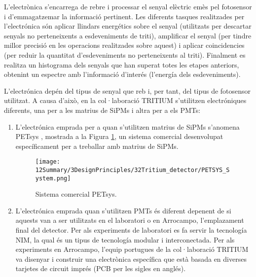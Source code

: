 L'electrònica s'encarrega de rebre i processar el senyal elèctric emès pel fotosensor i d'emmagatzemar la informació pertinent. Les diferents tasques realitzades per l'electrónica són aplicar llindars energétics sobre el senyal (utilitzats per descartar senyals no perteneixents a esdeveniments de triti), amplificar el senyal (per tindre millor precisió en les operacions realitzades sobre aquest) i aplicar coincidencies (per reduir la quantitat d'esdeveniments no perteneixents al triti). Finalment es realitza un histograma dels senyals que han superat totes les etapes anteriors, obtenint un espectre amb l'informació d'interés (l'energía dels esdeveniments). 

L'electrónica depén del tipus de senyal que reb i, per tant, del tipus de fotosensor utilitzat. A causa d'això, en la col·laboració TRITIUM s'utilitzen electróniques diferents, una per a les matrius de SiPMs i altra per a els PMTs:

\begin{enumerate}

\item{} L'electrónica emprada per a quan s'utilitzen matrius de SiPMs s'anomena PETsys \cite{PETSYS}, mostrada a la Figura \ref{fig:PETSYSs}, un sistema comercial desenvolupat específicament per a treballar amb matrius de SiPMs. 

\begin{figure}[h]
\texttt{[image: 12Summary/3DesignPrinciples/32Tritium\_detector/PETSYS\_System.png]}
\centering
\caption{Sistema comercial PETsys\label{fig:PETSYSs}.}
\end{figure}

\item{} L'electrónica emprada quan s'utilitzen PMTs és diferent depenent de si aquests van a ser utilitzats en el laboratori o en Arrocampo, l'emplazament final del detector. Per als experiments de laboratori es fa servir la tecnología NIM, la qual és un tipus de tecnología modular i interconectada. Per als experiments en Arrocampo, l'equip portugues de la col·laboració TRITIUM va disenyar i construir una electrònica específica que està basada en diverses tarjetes de circuit imprés (PCB per les sigles en anglés).

\end{enumerate}